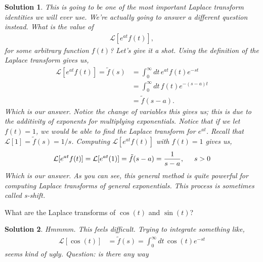 \documentclass[11pt]{article}
\newtheorem*{solution}{Solution}
\theoremstyle{mystyle}
\begin{document}
\begin{psexample}{}{}
\begin{hwproblem}
    \end{hwproblem}
    \begin{solution}
        This is going to be one of the most important Laplace
        transform identities we will ever use.
        We're actually going to answer
        a \emph{different} question instead. What
        is the value of
        \begin{align*}
            \mathcal{L}[e^{at}f(t)],
        \end{align*}
        for some arbitrary function $f(t)$? Let's
        give it a shot. Using the definition of
        the Laplace transform gives us,
        \begin{align*}
            \mathcal{L}[e^{at}f(t)] = \tilde{f}(s) 
            & = \int_0^\infty dt \, e^{at}f(t) e^{-st}\\
            & =  \int_0^\infty dt \, f(t) e^{-(s - a)t}\\
            & = \tilde{f}(s - a).
        \end{align*}
        Which is our answer. Notice the change of variables
        this gives us; this is due to the additivity of exponents
        for multiplying exponentials. Notice that if we let $f(t) = 1$,
        we would be able to find the Laplace transform for $e^{at}$.
        Recall that $\mathcal{L}[1] = \tilde{f}(s) = 1/s$.
        Computing $\mathcal{L}[e^{at}f(t)]$ with $f(t) = 1$
        gives us,
        \begin{align*}
            \mathcal{L}[e^{at}f(t)] = \mathcal{L}[e^{at}(1)]
            = \tilde{f}(s - a) = \frac{1}{s - a}, \hspace{0.5cm} s > 0
        \end{align*}
        Which is our answer. As you can see, this general
        method is quite powerful for computing Laplace transforms
        of general exponentials. This process is sometimes
        called \emph{s-shift}.
    \end{solution}
    \begin{hwproblem}
        What are the Laplace transforms of $\cos{(t)}$ and $\sin{(t)}$?
    \end{hwproblem}
    \begin{solution}
        Hmmmm. This feels difficult. Trying to integrate something like,
        \begin{align*}
            \mathcal{L}[\cos{(t)}] & = \tilde{f}(s) = \int_0^\infty dt \, \cos{(t)}e^{-st}
        \end{align*}
        seems kind of ugly. Question: is there any way

\end{solution}
\end{psexample}
\end{document}

